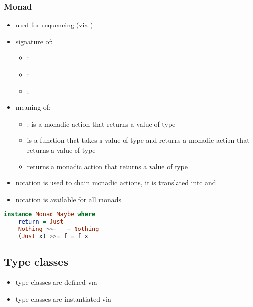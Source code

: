 \documentclass[a4paper,landscape,10pt]{article}
\begin{document}
\begin{multicols*}{2}
  \subsubsection{Monad}

  \begin{itemize}
    \item used for sequencing (via \ihaskell{>>=})
    \item signature of:
          \begin{itemize}
            \item \ihaskell{>>=}: 
            \item \ihaskell{>>}: 
            \item {}: 
          \end{itemize}
    \item meaning of:
          \begin{itemize}
            \item \ihaskell{>>=}:  is a monadic action that returns a value of type 
            \item {} is a function that takes a value of type  and returns a monadic action that returns a value of type 
            \item \ihaskell{>>=} returns a monadic action that returns a value of type 
          \end{itemize}
    \item {} notation is used to chain monadic actions, it is translated into \ihaskell{>>=} and \ihaskell{>>}
    \item {} notation is available for all monads
  \end{itemize}

  \begin{lstlisting}[language=Haskell]
instance Monad Maybe where
    return = Just
    Nothing >>= _ = Nothing
    (Just x) >>= f = f x
\end{lstlisting}

  \breakcolumn

  \subsection{Type classes}

  \begin{itemize}
    \item type classes are defined via 
    \item type classes are instantiated via 
  \end{itemize}


\end{multicols*}
\end{document}
